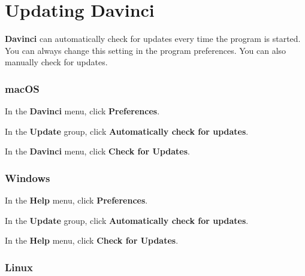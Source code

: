 \section{Updating Davinci}

\textbf{Davinci} can automatically check for updates every time the program is started. You can always change this setting in the program preferences. You can also manually check for updates.

\subsubsection{macOS}

\begin{boxitemize}
	\item In the \textbf{Davinci} menu, click \textbf{Preferences}.
	\item In the \textbf{Update} group, click \textbf{Automatically check for updates}.
	\item In the \textbf{Davinci} menu, click \textbf{Check for Updates}.
\end{boxitemize}

\subsubsection{Windows}

\begin{boxitemize}
	\item In the \textbf{Help} menu, click \textbf{Preferences}.
	\item In the \textbf{Update} group, click \textbf{Automatically check for updates}.
	\item In the \textbf{Help} menu, click \textbf{Check for Updates}.
\end{boxitemize}

\subsubsection{Linux}

